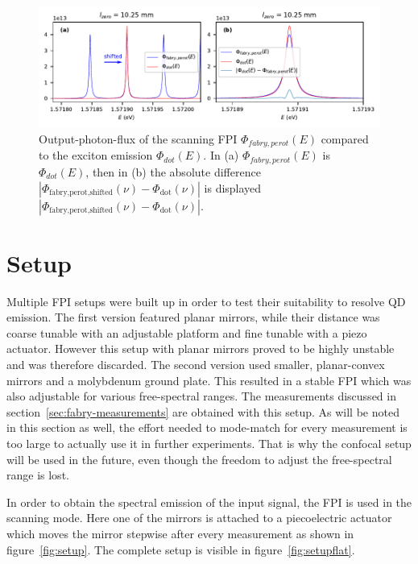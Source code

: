 \begin{figure}[H]
	\centering
	\includegraphics[width=\linewidth]{figures/fabry-perot/plots/simulation-comparison-dot-fabry-perot-output-error}
	\caption{Output-photon-flux of the scanning FPI $\Phi_{fabry,perot}(E)$ compared to the exciton emission $\Phi_{dot}(E)$.
	In (a) $\Phi_{fabry,perot}(E)$ is $\Phi_{dot}(E)$, then in (b) the absolute difference $\left|\Phi_{\text{fabry,perot,shifted}}(\nu) - \Phi_{\text{dot}}(\nu)\right|$ is displayed $\left|\Phi_{\text{fabry,perot,shifted}}(\nu) - \Phi_{\text{dot}}(\nu)\right|$.}
	\label{fig:simulation-comparison-dot-fabry-perot-output-error}
\end{figure}





\section{Setup}

Multiple \ac{FPI} setups were built up in order to test their suitability to resolve \ac{QD} emission.
The first version featured planar mirrors, while their distance was coarse tunable with an adjustable platform and fine tunable with a piezo actuator.
However this setup with planar mirrors proved to be highly unstable and was therefore discarded.
The second version used smaller, planar-convex mirrors and a molybdenum ground plate.
This resulted in a stable \ac{FPI} which was also adjustable for various free-spectral ranges.
The measurements discussed in section~\ref{sec:fabry-measurements} are obtained with this setup.
As will be noted in this section as well, the effort needed to mode-match for every measurement is too large to actually use it in further experiments.
That is why the confocal setup will be used in the future, even though the freedom to adjust the free-spectral range is lost.

In order to obtain the spectral emission of the input signal, the \ac{FPI} is used in the scanning mode.
Here one of the mirrors is attached to a piecoelectric actuator which moves the mirror stepwise after every measurement as shown in figure~\ref{fig:setup}. The complete setup is visible in figure~\ref{fig:setupflat}.

